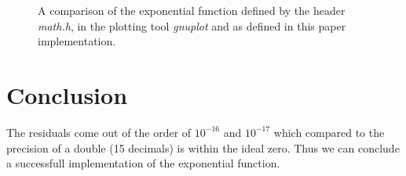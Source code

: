 \documentclass[a4paper, twocolumn, 11pt, oneside]{memoir}
\begin{document}
\begin{figure}[ht]
\centering

\caption{A comparison of the exponential function defined by the header
\textsl{math.h}, in the plotting tool \textsl{gnuplot} and as defined in this
paper implementation.}
\label{fig:exp.tex}
\end{figure}

\section{Conclusion}
The residuals come out of the order of $10^{-16}$ and $10^{-17}$ which compared
to the precision of a double (15 decimals) is within the ideal zero. Thus we
can conclude a successfull implementation of the exponential function.

\printbibliography
\end{document}
